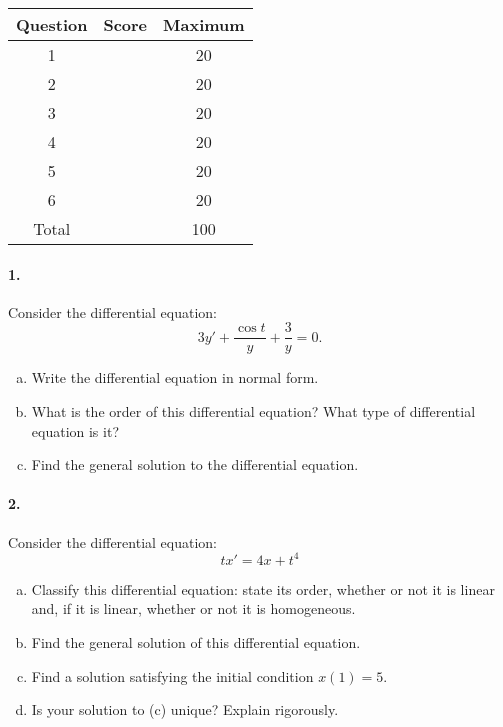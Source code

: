 \documentclass[11pt]{article}
\begin{document}
\begin{table}[!ht] 
\begin{center}
\begin{tabular}{|c|c|c|}  \hline
Question & Score & Maximum \\ \hline \hline
1 &  & 20  \\ [2ex] \hline 
2 &  & 20  \\ [2ex]\hline
3 &  & 20  \\ [2ex]\hline
4 &  & 20  \\ [2ex]\hline
5 &  & 20  \\ [2ex]\hline
6 &  & 20 \\ [2ex] \hline
Total &  & 100 \\[2ex] \hline
\end{tabular}
\end{center}
\end{table}


\newpage
\paragraph{1.} Consider the differential equation:
\[
3y'+\frac{\cos t}{y}+\frac{3}{y}=0.
\]
  

\begin{enumerate}[(a)]
    \item Write the differential equation in normal form.
    \item What is the order of this differential equation?  What type of differential equation is it?
    \item Find the general solution to the differential equation.
\end{enumerate}


\newpage
\paragraph{2.} Consider the differential equation:
\[
tx' = 4x + t^4
\]

\begin{enumerate}[(a)]
    \item Classify this differential equation: state its order, whether or not it is linear and, if it is linear, whether or not it is homogeneous.
    \item Find the general solution of this differential equation.
    \item Find a solution satisfying the initial condition $x(1)=5$.
    \item Is your solution to (c) unique? Explain rigorously.
\end{enumerate}
\end{document}
